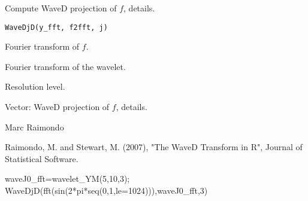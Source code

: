 \begin{Description}\relax
Compute WaveD projection of $f$, details.
\end{Description}
\begin{Usage}
\begin{verbatim}
WaveDjD(y_fft, f2fft, j)
\end{verbatim}
\end{Usage}
\begin{Arguments}
\begin{ldescription}
\item[\code{y\_fft}] Fourier transform of $f$. 
\item[\code{f2fft}] Fourier transform of the wavelet.
\item[\code{j}] Resolution level. 
\end{ldescription}
\end{Arguments}
\begin{Value}
Vector:  WaveD projection of $f$, details.
\end{Value}
\begin{Author}\relax
Marc Raimondo
\end{Author}
\begin{References}\relax
Raimondo, M. and Stewart, M. (2007),
"The WaveD Transform in R", Journal of Statistical Software.
\end{References}
\begin{SeeAlso}\relax
{}
\end{SeeAlso}
\begin{Examples}
\begin{ExampleCode}

waveJ0_fft=wavelet_YM(5,10,3);
WaveDjD(fft(sin(2*pi*seq(0,1,le=1024))),waveJ0_fft,3)
\end{ExampleCode}
\end{Examples}

